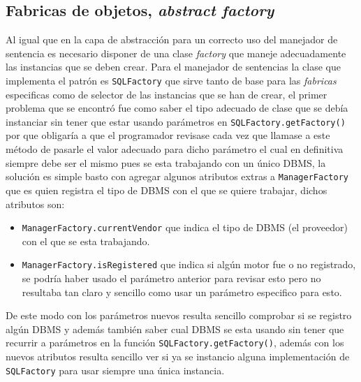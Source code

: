 \subsection{Fabricas de objetos, \textit{abstract factory}}
%
Al igual que en la capa de abstracción para un correcto uso del manejador de sentencia es necesario disponer de una clase \textit{factory} que maneje adecuadamente las instancias que se deben crear. Para el manejador de sentencias la clase que implementa el patrón es \verb=SQLFactory= que sirve tanto de base para las \textit{fabricas} especificas como de selector de las instancias que se han de crear, el primer problema que se encontró fue como saber el tipo adecuado de clase que se debía instanciar sin tener que estar usando parámetros en \verb=SQLFactory.getFactory()= por que obligaría a que el programador revisase cada vez que llamase a este método de pasarle el valor adecuado para dicho parámetro el cual en definitiva siempre debe ser el mismo pues se esta trabajando con un único DBMS, la solución es simple basto con agregar algunos atributos extras a \verb=ManagerFactory= que es quien registra el tipo de DBMS con el que se quiere trabajar, dichos atributos son:
%
\begin{itemize}
\item \verb=ManagerFactory.currentVendor= que indica el tipo de DBMS (el proveedor) con el que se esta trabajando.
\item \verb=ManagerFactory.isRegistered= que indica si algún motor fue o no registrado, se podría haber usado el parámetro anterior para revisar esto pero no resultaba tan claro y sencillo como usar un parámetro especifico para esto.
\end{itemize}
%
De este modo con los parámetros nuevos resulta sencillo comprobar si se registro algún DBMS y además también saber cual DBMS se esta usando sin tener que recurrir a parámetros en la función  \verb=SQLFactory.getFactory()=, además con los nuevos atributos resulta sencillo ver si ya se instancio alguna implementación de \verb=SQLFactory= para usar siempre una única instancia.

